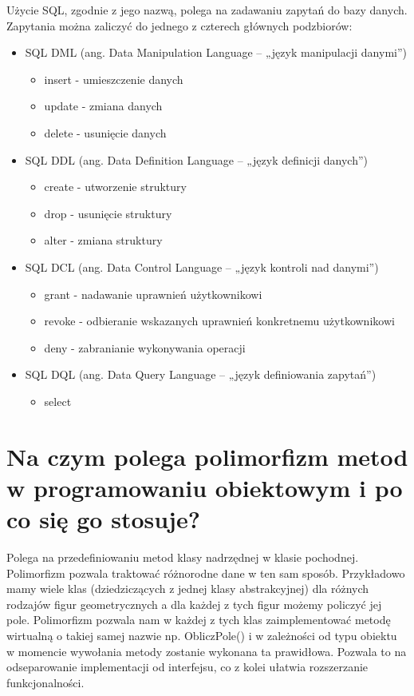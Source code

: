 \documentclass[12pt,a4paper]{article}
\begin{document}
	Użycie SQL, zgodnie z jego nazwą, polega na zadawaniu zapytań do bazy danych. Zapytania można zaliczyć do jednego z czterech głównych podzbiorów:
	\begin{itemize}
		\item SQL DML (ang. Data Manipulation Language – „język manipulacji danymi”)
			\begin{itemize}
				\item insert - umieszczenie danych
				\item update - zmiana danych
				\item delete - usunięcie danych
			\end{itemize}
		\item SQL DDL (ang. Data Definition Language – „język definicji danych”)
			\begin{itemize}
				\item create - utworzenie struktury
				\item drop - usunięcie struktury
				\item alter - zmiana struktury
			\end{itemize}
		\item SQL DCL (ang. Data Control Language – „język kontroli nad danymi”)
			\begin{itemize}
				\item grant - nadawanie uprawnień użytkownikowi 
				\item revoke - odbieranie wskazanych uprawnień konkretnemu użytkownikowi
				\item deny - zabranianie wykonywania operacji
			\end{itemize}
		\item SQL DQL (ang. Data Query Language – „język definiowania zapytań”)
			\begin{itemize}
				\item select
			\end{itemize}
	\end{itemize}

	\section{Na czym polega polimorfizm metod w programowaniu obiektowym i po co się go stosuje?}
	Polega na przedefiniowaniu metod klasy nadrzędnej w klasie pochodnej. Polimorfizm pozwala traktować różnorodne dane w ten sam sposób. Przykładowo mamy wiele klas (dziedziczących z jednej klasy abstrakcyjnej) dla różnych rodzajów figur geometrycznych a dla każdej z tych figur możemy policzyć jej pole. Polimorfizm pozwala nam w każdej z tych klas zaimplementować metodę wirtualną o takiej samej nazwie np. ObliczPole() i w zależności od typu obiektu w momencie wywołania metody zostanie wykonana ta prawidłowa. Pozwala to na odseparowanie implementacji od interfejsu, co z kolei ułatwia rozszerzanie funkcjonalności.
\end{document}
